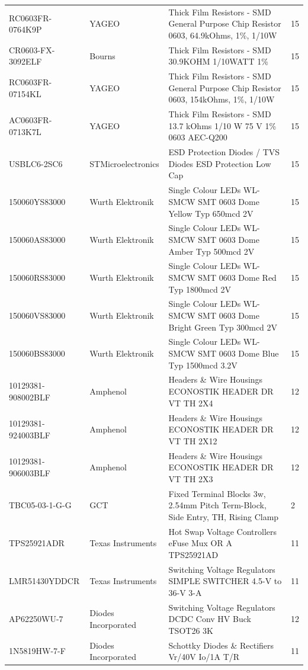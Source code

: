 \begin{landscape}
\begin{center}
\begin{longtable}{@{} p{6cm} p{5cm} p{10cm} p{2cm} @{}}
			RC0603FR-0764K9P & YAGEO & Thick Film Resistors - SMD General Purpose Chip Resistor 0603, 64.9kOhms, 1\%, 1/10W & 15 \\
			CR0603-FX-3092ELF & Bourns & Thick Film Resistors - SMD 30.9KOHM 1/10WATT 1\% & 15 \\
			RC0603FR-07154KL & YAGEO & Thick Film Resistors - SMD General Purpose Chip Resistor 0603, 154kOhms, 1\%, 1/10W & 15 \\
			AC0603FR-0713K7L & YAGEO & Thick Film Resistors - SMD 13.7 kOhms 1/10 W 75 V 1\% 0603 AEC-Q200 & 15 \\
			USBLC6-2SC6 & STMicroelectronics & ESD Protection Diodes / TVS Diodes ESD Protection Low Cap & 15 \\
			150060YS83000 & Wurth Elektronik & Single Colour LEDs WL-SMCW SMT 0603 Dome Yellow Typ 650mcd 2V & 15 \\
			150060AS83000 & Wurth Elektronik & Single Colour LEDs WL-SMCW SMT 0603 Dome Amber Typ 500mcd 2V & 15 \\
			150060RS83000 & Wurth Elektronik & Single Colour LEDs WL-SMCW SMT 0603 Dome Red Typ 1800mcd 2V & 15 \\
			150060VS83000 & Wurth Elektronik & Single Colour LEDs WL-SMCW SMT 0603 Dome Bright Green Typ 300mcd 2V & 15 \\
			150060BS83000 & Wurth Elektronik & Single Colour LEDs WL-SMCW SMT 0603 Dome Blue Typ 1500mcd 3.2V & 15 \\
			10129381-908002BLF & Amphenol & Headers \& Wire Housings ECONOSTIK HEADER DR VT TH 2X4 & 12 \\
			10129381-924003BLF & Amphenol & Headers \& Wire Housings ECONOSTIK HEADER DR VT TH 2X12 & 12 \\
			10129381-906003BLF & Amphenol & Headers \& Wire Housings ECONOSTIK HEADER DR VT TH 2X3 & 12 \\
			TBC05-03-1-G-G & GCT & Fixed Terminal Blocks 3w, 2.54mm Pitch Term-Block, Side Entry, TH, Rising Clamp & 2 \\
			TPS25921ADR & Texas Instruments & Hot Swap Voltage Controllers eFuse Mux OR A TPS25921AD & 11 \\
			LMR51430YDDCR & Texas Instruments & Switching Voltage Regulators SIMPLE SWITCHER 4.5-V to 36-V 3-A & 11 \\
			AP62250WU-7 & Diodes Incorporated & Switching Voltage Regulators DCDC Conv HV Buck TSOT26 3K & 12 \\
			1N5819HW-7-F & Diodes Incorporated & Schottky Diodes \& Rectifiers Vr/40V Io/1A T/R & 11 \\

\end{longtable}
\end{center}
\end{landscape}
